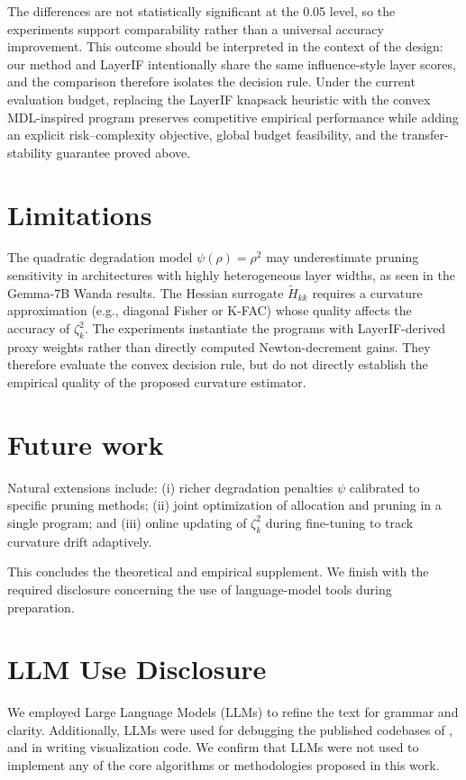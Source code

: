 \documentclass[accepted]{uai2026}%
\theoremstyle{remark}%
\begin{document}
The differences are not statistically significant at the 0.05 level, so
the experiments support comparability rather than a universal accuracy
improvement. This outcome should be interpreted in the context of the design:
our method and LayerIF intentionally share the same influence-style layer
scores, and the comparison therefore isolates the decision rule. Under the
current evaluation budget, replacing the LayerIF knapsack heuristic with the
convex MDL-inspired program preserves competitive empirical performance while
adding an explicit risk--complexity objective, global budget feasibility, and
the transfer-stability guarantee proved above.

\section{Limitations} \label{sec:limit}
The quadratic degradation model $\psi(\rho)=\rho^2$ may
underestimate pruning sensitivity in architectures with highly
heterogeneous layer widths, as seen in the Gemma-7B Wanda results.
The Hessian surrogate $\widetilde{H}_{kk}$ requires a curvature
approximation (e.g., diagonal Fisher or K-FAC) whose quality affects
the accuracy of $\zeta_k^2$.
The experiments instantiate the programs with LayerIF-derived proxy
weights rather than directly computed Newton-decrement gains. They therefore
evaluate the convex decision rule, but do not directly establish the empirical quality of the proposed curvature estimator.

\section{Future work} \label{sec:future}
Natural extensions include: (i) richer degradation penalties
$\psi$ calibrated to specific pruning methods;
(ii) joint optimization of allocation and pruning in a single
program; and (iii) online updating of $\zeta_k^2$ during fine-tuning
to track curvature drift adaptively.

This concludes the theoretical and empirical supplement. We finish with the
required disclosure concerning the use of language-model tools during
preparation.



\section{LLM Use Disclosure}
We employed Large Language Models (LLMs) to refine the text for grammar and clarity. Additionally, LLMs were used for debugging the published codebases of \citet{layerIF}, \citet{datainf} and in writing  visualization code. We confirm that LLMs were not used to implement any of the core algorithms or methodologies proposed in this work.
\end{document}
